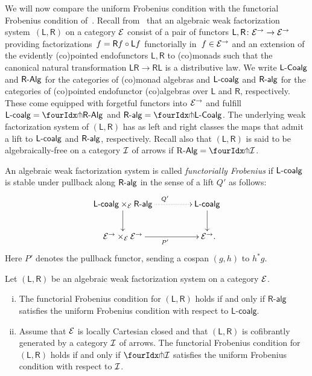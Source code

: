 \documentclass[reqno,10pt,a4paper,oneside,draft]{amsart}
\begin{document}
{
\newcommand{\LL}{\mathsf{L}}
\newcommand{\RR}{\mathsf{R}}

We will now compare the uniform Frobenius condition with the functorial Frobenius condition of~\cite{garner:topological-simplicial}.
Recall from~\cite{bourke-garner-I} that an algebraic weak factorization system~$(\LL, \RR)$ on a category $\cal{E}$ consist of a pair of functors $\LL, \RR \co \cal{E}^\to \to \cal{E}^\to$ providing factorizations~$f = \RR f \cc \LL f$ functorially in~$f \in \cal{E}^\to$ and an extension of the evidently (co)pointed endofunctors $\LL, \RR$ to (co)monads such that the canonical natural transformation $\LL \RR \to \RR \LL$ is a distributive law.
We write $\pCoalg{\LL}$ and $\pAlg{\RR}$ for the categories of (co)monad algebras and $\pcoalg{\LL}$ and $\palg{\RR}$ for the categories of (co)pointed endofunctor (co)algebras over $\LL$ and $\RR$, respectively.
These come equipped with forgetful functors into $\cal{E}^\to$ and fulfill $\pcoalg{\LL} = \liftl{\pAlg{\RR}}$ and $\palg{\RR} = \liftr{\pCoalg{\LL}}$.
The underlying weak factorization system of $(\LL, \RR)$ has as left and right classes the maps that admit a lift to $\pcoalg{\LL}$ and $\palg{\RR}$, respectively.
Recall also that $(\LL, \RR)$ is said to be algebraically-free on a category $\cal{I}$ of arrows if $\pAlg{\R} = \liftr{\cal{I}}$.

\begin{definition} \label{functorial-frobenius}
An algebraic weak factorization system is called \emph{functorially Frobenius} if $\pcoalg{\LL}$ is stable under pullback along $\palg{\RR}$ in the sense of a lift $Q'$ as follows:
\[
\xymatrix@C+2em{
  \pcoalg{\LL} \times_{\cal{E}} \palg{\RR}
  \ar@{.>}[r]^{Q'}
  \ar[d]
&
  \pcoalg{\LL}
  \ar[d]
\\
  \cal{E}^\to \times_{\cal{E}} \cal{E}^\to
  \ar[r]_{P'}
&
  \cal{E}^\to
\rlap{.}}
\]
Here $P'$ denotes the pullback functor, sending a cospan $(g, h)$ to $h^* g$.
\end{definition}

\begin{theorem} \label{thm:frobenius-comparison}
Let $(\mathsf{L}, \mathsf{R})$ be an algebraic weak factorization system on a category $\cal{E}$.
\begin{enumerate}[(i)]
\item
The functorial Frobenius condition for $(\LL, \RR)$ holds if and only if $\mathsf{R}$-$\mathsf{alg}$ satisfies the uniform Frobenius condition with respect to $\mathsf{L}$-$\mathsf{coalg}$.
\item
Assume that $\cal{E}$ is locally Cartesian closed and that $(\LL, \RR)$ is cofibrantly generated by a category $\cal{I}$ of arrows.
The functorial Frobenius condition for $(\LL, \RR)$ holds if and only if $\liftr{\cal{I}}$ satisfies the uniform Frobenius condition with respect to $\cal{I}$.
\end{enumerate}
\end{theorem}

}
\end{document}
